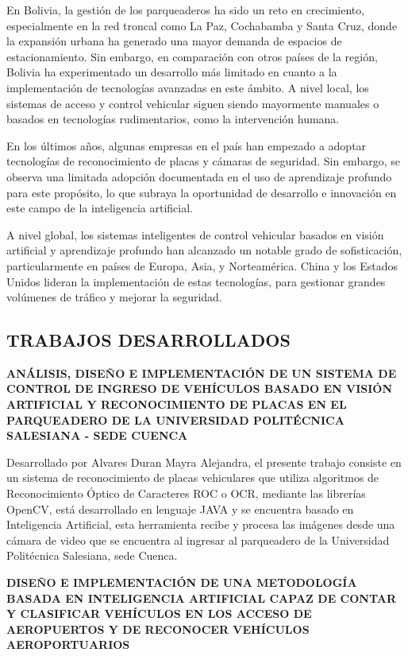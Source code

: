 En Bolivia, la gestión de los parqueaderos ha sido un reto en
crecimiento, especialmente en la red troncal como La Paz, Cochabamba y
Santa Cruz, donde la expansión urbana ha generado una mayor demanda de
espacios de estacionamiento. Sin embargo, en comparación con otros
países de la región, Bolivia ha experimentado un desarrollo más limitado
en cuanto a la implementación de tecnologías avanzadas en este ámbito. A
nivel local, los sistemas de acceso y control vehicular siguen siendo
mayormente manuales o basados en tecnologías rudimentarios, como la
intervención humana.

En los últimos años, algunas empresas en el país han empezado a adoptar
tecnologías de reconocimiento de placas y cámaras de seguridad. Sin
embargo, se observa una limitada adopción documentada en el uso de aprendizaje
profundo para este propósito, lo que subraya la oportunidad de desarrollo e
innovación en este campo de la inteligencia artificial.

A nivel global, los sistemas inteligentes de control vehicular basados
en visión artificial y aprendizaje profundo han alcanzado un notable
grado de sofisticación, particularmente en países de Europa, Asia, y
Norteamérica. China y los Estados Unidos lideran la implementación de
estas tecnologías, para gestionar grandes volúmenes de tráfico y mejorar
la seguridad.
\subsection*{TRABAJOS DESARROLLADOS}

\textbf{ANÁLISIS, DISEÑO E IMPLEMENTACIÓN DE UN SISTEMA DE CONTROL DE
INGRESO DE VEHÍCULOS BASADO EN VISIÓN ARTIFICIAL Y RECONOCIMIENTO DE
PLACAS EN EL PARQUEADERO DE LA UNIVERSIDAD POLITÉCNICA SALESIANA - SEDE
CUENCA}

Desarrollado por Alvares Duran Mayra Alejandra\cite{alvares2014control}, el presente
trabajo consiste en un sistema de reconocimiento de placas vehiculares
que utiliza algoritmos de Reconocimiento Óptico de Caracteres ROC o OCR,
mediante las librerías OpenCV, está desarrollado en lenguaje JAVA y se
encuentra basado en Inteligencia Artificial, esta herramienta recibe y
procesa las imágenes desde una cámara de video que se encuentra al
ingresar al parqueadero de la Universidad Politécnica Salesiana, sede
Cuenca.

\textbf{DISEÑO E IMPLEMENTACIÓN DE UNA METODOLOGÍA BASADA EN
INTELIGENCIA ARTIFICIAL CAPAZ DE CONTAR Y CLASIFICAR VEHÍCULOS EN LOS
ACCESO DE AEROPUERTOS Y DE RECONOCER VEHÍCULOS AEROPORTUARIOS}

